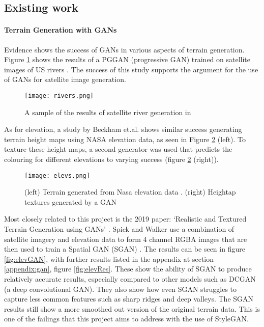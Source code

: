 \documentclass[a4paper]{report}
\begin{document}
\subsection{Existing work}
\paragraph{Terrain Generation with GANs}
Evidence shows the success of GANs in various aspects of terrain generation. Figure \ref{fig:rivers} shows the results of a PGGAN (progressive GAN) trained on satellite images of US rivers \cite{riverSat}. The success of this study supports the argument for the use of GANs for satellite image generation.

\begin{figure}[H]
    \centering
        \texttt{[image: rivers.png]}
        \caption{A sample of the results of satellite river generation in \cite{riverSat}}
        \label{fig:rivers}
\end{figure}

As for elevation, a study by Beckham et.al.\cite{beckham2017step} shows similar success generating terrain height maps using NASA elevation data, as seen in Figure \ref{fig:elevs} (left). To texture these height maps, a second generator was used that predicts the colouring for different elevations to varying success (figure \ref{fig:elevs} (right)).

\begin{figure}[H]
    \centering
        \texttt{[image: elevs.png]}
        \caption{(left) Terrain generated from Nasa elevation data \cite{beckham2017step}. (right) Heightap textures generated by a GAN \cite{beckham2017step}}
        \label{fig:elevs}
\end{figure}

Most closely related to this project is the 2019 paper: `Realistic and Textured Terrain Generation using GANs' \cite{spick}. Spick and Walker use a combination of satellite imagery and elevation data to form 4 channel RGBA images that are then used to train a Spatial GAN (SGAN) \cite{sgan}. The results can be seen in figure \ref{fig:elevGAN}, with further results listed in the appendix at section \ref{appendix:gan}, figure \ref{fig:elevRes}. These show the ability of SGAN to produce relatively accurate results, especially compared to other models such as DCGAN (a deep convolutional GAN). They also show how even SGAN struggles to capture less common features such as sharp ridges and deep valleys. The SGAN results still show a more smoothed out version of the original terrain data. This is one of the failings that this project aims to address with the use of StyleGAN. 
\end{document}

